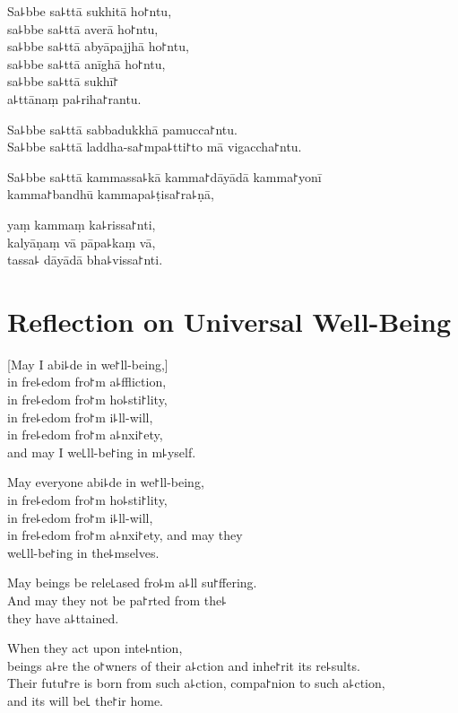 Sa꜕bbe sa꜕ttā sukhitā ho꜓ntu,\\
sa꜕bbe sa꜕ttā averā ho꜓ntu,\\
sa꜕bbe sa꜕ttā abyāpajjhā ho꜓ntu,\\
sa꜕bbe sa꜕ttā anīghā ho꜓ntu,\\
sa꜕bbe sa꜕ttā sukhī꜓\\
a꜕ttānaṃ pa꜕riha꜓rantu.

Sa꜕bbe sa꜕ttā sabbadukkhā pamucca꜓ntu.\\
Sa꜕bbe sa꜕ttā laddha-sa꜓mpa꜕tti꜓to mā vigaccha꜓ntu.

Sa꜕bbe sa꜕ttā kammassa꜕kā kamma꜓dāyādā kamma꜓yonī\\
\vin kamma꜓bandhū kammapa꜕ṭisa꜓ra꜕ṇā,

yaṃ kammaṃ ka꜕rissa꜓nti,\\
kalyāṇaṃ vā pāpa꜕kaṃ vā,\\
tassa꜕ dāyādā bha꜕vissa꜓nti.

\chapter[Universal Well-Being]{Reflection on Universal Well-Being}%

\begin{leader}
\end{leader}

[May I abi꜕de in we꜓ll-being,]\\
in fre꜕edom fro꜓m a꜕ffliction,\\
in fre꜕edom fro꜓m ho꜕sti꜓lity,\\
in fre꜕edom fro꜓m i꜕ll-will,\\
in fre꜕edom fro꜓m a꜕nxi꜓ety,\\
and may I  we꜖ll-be꜓ing in m꜕yself.

May everyone abi꜕de in we꜓ll-being,\\
in fre꜕edom fro꜓m ho꜕sti꜓lity,\\
in fre꜕edom fro꜓m i꜕ll-will,\\
in fre꜕edom fro꜓m a꜕nxi꜓ety, and may they\\
 we꜖ll-be꜓ing in the꜕mselves.

May  beings be rele꜖ased fro꜕m a꜕ll su꜓ffering.\\
And may they not be pa꜓rted from the꜕\\
 they have a꜕ttained.

When they act upon inte꜕ntion,\\
 beings a꜕re the o꜓wners of their a꜕ction and inhe꜓rit its re꜕sults.\\
Their futu꜓re is born from such a꜕ction, compa꜓nion to such a꜕ction,\\
and its  will be꜖ the꜓ir home.

